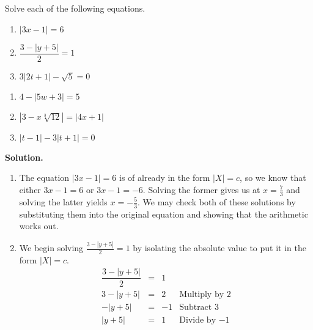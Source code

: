 \begin{ex} \label{absvalueeqnex}  Solve each of the following equations.

\vspace*{-.1in}

\begin{multicols}{3}
\begin{enumerate}

\item  $|3x-1| = 6$
\item  $\dfrac{3 - |y+5|}{2} = 1$
\item  $3|2t+1| - \sqrt{5} = 0$

\setcounter{HW}{\value{enumi}}
\end{enumerate}
\end{multicols}

\vspace*{-.3in}

\begin{multicols}{3}
\begin{enumerate}
\setcounter{enumi}{\value{HW}}

\item  $4 - |5w+3| = 5$

\item  $\left|3 - x \sqrt[3]{12}\right| = |4x+1|$

\item  $|t-1| - 3|t+1| = 0$

\end{enumerate}
\end{multicols}

\pagebreak

{\bf Solution.} 

\begin{enumerate}

\item  The equation  $|3x-1| = 6$ is of already in the form $|X| = c$, so we know that either $3x-1=6$ or $3x-1 = -6$.  Solving the former gives us at $x = \frac{7}{3}$ and solving the latter yields $x = -\frac{5}{3}$.  We may check both of these solutions by substituting them into the original equation and showing that the arithmetic works out.

\item  We begin solving  $\frac{3 - |y+5|}{2} = 1$ by isolating the absolute value to put it in the form $|X| = c$.\[ \begin{array}{rclr}
\dfrac{3 - |y+5|}{2} & = & 1 &  \\
3 - |y+5| & = & 2 & \text{Multiply by $2$}\\
-|y+5| & = & -1 & \text{Subtract $3$} \\
|y+5| & = & 1 & \text{Divide by $-1$}  \\ 


\end{array}\]
\end{enumerate}
\end{ex}
